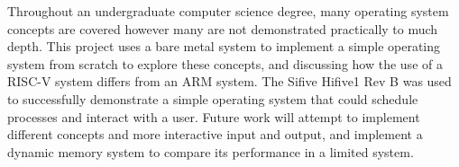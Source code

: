 
Throughout an undergraduate computer science degree, many operating system concepts are covered however many are not demonstrated practically to much depth. This project uses a bare metal system to implement a simple operating system from scratch to explore these concepts, and discussing how the use of a RISC-V system differs from an ARM system. The Sifive Hifive1 Rev B was used to successfully demonstrate a simple operating system that could schedule processes and interact with a user. Future work will attempt to implement different concepts and more interactive input and output, and implement a dynamic memory system to compare its performance in a limited system.